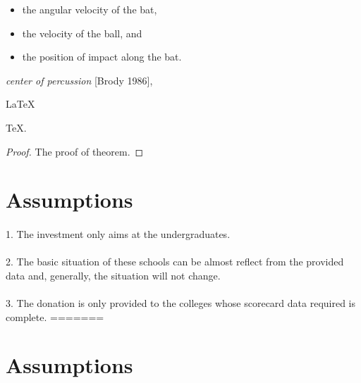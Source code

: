 \documentclass{mcmthesis}
\begin{document}
\begin{itemize}
\item the angular velocity of the bat,
\item the velocity of the ball, and
\item the position of impact along the bat.
\end{itemize}
\lipsum[4]
\emph{center of percussion} [Brody 1986], \lipsum[5]



\begin{Theorem} \label{thm:latex}
\LaTeX
\end{Theorem}
\begin{Lemma} \label{thm:tex}
\TeX .
\end{Lemma}
\begin{proof}
The proof of theorem.
\end{proof}


\section{Assumptions}

\paragraph{} 1. The investment only aims at the undergraduates.
\paragraph{} 2. The basic situation of these schools can be almost reflect from the provided data and, generally, the situation will not change.
\paragraph{} 3. The donation is only provided to the colleges whose scorecard data required is complete.
=======



\section{Assumptions}
\end{document}
